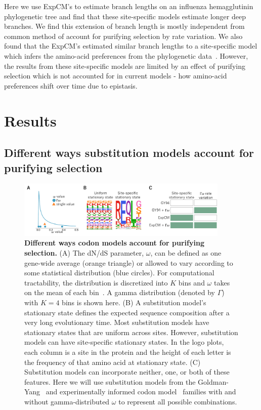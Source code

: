\documentclass[11pt]{article}
\begin{document}
Here we use ExpCM's to estimate branch lengths on an influenza hemagglutinin phylogenetic tree and find that these site-specific models estimate longer deep branches. 
We find this extension of branch length is mostly independent from common method of account for purifying selection by rate variation. 
We also found that the ExpCM's estimated similar branch lengths to a site-specific model which infers the amino-acid preferences from the phylogenetic data~\citep{lartillot2004bayesian, rodrigue2014site}.
However, the results from these site-specific models are limited by an effect of purifying selection which is not accounted for in current models - how amino-acid preferences shift over time due to epistasis.

\section*{Results}

\subsection*{Different ways substitution models account for purifying selection}

\begin{figure}
\centerline{\includegraphics[width=0.90\textwidth]{figures/model_feature.pdf}}
\caption{\label{fig:model_feature}
\textbf{Different ways codon models account for purifying selection.}
(A) The dN/dS parameter, $\omega$, can be defined as one gene-wide average (orange triangle) or allowed to vary according to some statistical distribution (blue circles). 
For computational tractability, the distribution is discretized into $K$ bins and $\omega$ takes on the mean of each bin~\citep{yang1994maximum,yang2000codon}. 
A gamma distribution (denoted by $\Gamma$) with $K=4$ bins is shown here.
(B) A substitution model's stationary state defines the expected sequence composition after a very long evolutionary time. 
Most substitution models have stationary states that are uniform across sites.
However, substitution models can have site-specific stationary states.
In the logo plots, each column is a site in the protein and the height of each letter is the frequency of that amino acid at stationary state. 
(C) Substitution models can incorporate neither, one, or both of these features.
Here we will use substitution models from the Goldman-Yang~\citep[GY94;][]{goldman1994codon,yang2000codon} and experimentally informed codon model~\citep[ExpCM;][]{hilton2017phydms} families with and without gamma-distributed $\omega$ to represent all possible combinations.
}
\end{figure}
\end{document}
